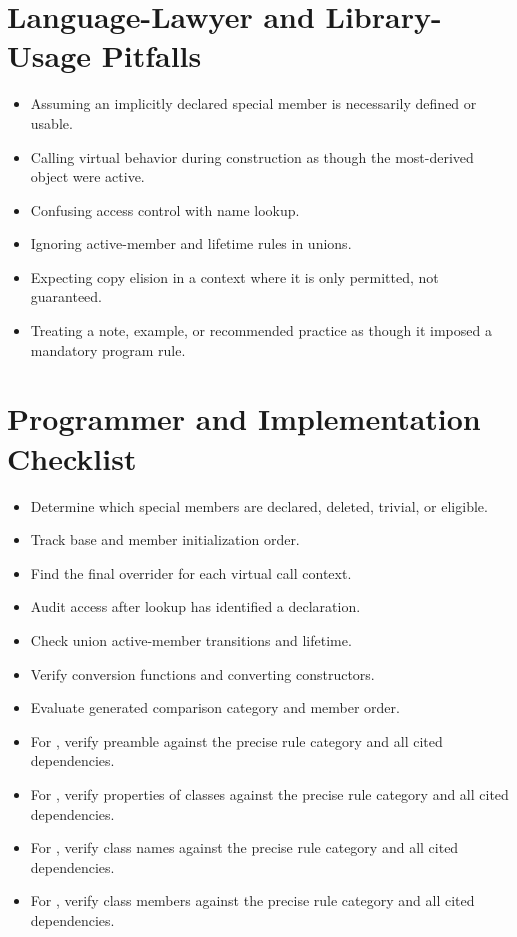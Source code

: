 \documentclass[11pt,letterpaper]{article}
\begin{document}
\section{Language-Lawyer and Library-Usage Pitfalls}
\begin{CornellReferencePitfallBox}\begin{itemize}[label=\textcolor{CornellReferenceAmber}{$\blacktriangleright$}]
\item Assuming an implicitly declared special member is necessarily defined or usable.
\item Calling virtual behavior during construction as though the most-derived object were active.
\item Confusing access control with name lookup.
\item Ignoring active-member and lifetime rules in unions.
\item Expecting copy elision in a context where it is only permitted, not guaranteed.
\item Treating a note, example, or recommended practice as though it imposed a mandatory program rule.
\end{itemize}\end{CornellReferencePitfallBox}
\section{Programmer and Implementation Checklist}
\begin{CornellReferenceChecklistBox}\begin{itemize}[label=$\square$]
\item Determine which special members are declared, deleted, trivial, or eligible.
\item Track base and member initialization order.
\item Find the final overrider for each virtual call context.
\item Audit access after lookup has identified a declaration.
\item Check union active-member transitions and lifetime.
\item Verify conversion functions and converting constructors.
\item Evaluate generated comparison category and member order.
\item For , verify preamble against the precise rule category and all cited dependencies.
\item For , verify properties of classes against the precise rule category and all cited dependencies.
\item For , verify class names against the precise rule category and all cited dependencies.
\item For , verify class members against the precise rule category and all cited dependencies.
\end{itemize}\end{CornellReferenceChecklistBox}
\end{document}
